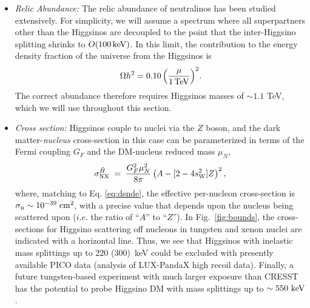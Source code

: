 \documentclass[11pt]{article}
\newcommand{\tev}{{\rm TeV}}
\newcommand{\kev}{{\rm keV}}
\newcommand{\be}{\begin{equation}}
\newcommand{\ee}{\end{equation}}
\begin{document}
\begin{itemize}
\item {\it Relic Abundance: } The relic abundance of neutralinos has been studied extensively. For simplicity, we will assume a spectrum where all superpartners other than the Higgsinos are decoupled to the point that the inter-Higgsino splitting shrinks to $O(100\, \kev)$. In this limit, the contribution to the energy density fraction of the universe from the Higgsinos is~\cite{ArkaniHamed:2006mb}
\be
\Omega h^2 = 0.10\, \Big( \frac{\mu}{1\, \tev} \Big)^2.
\ee
The correct abundance therefore requires Higgsinos masses of $\sim 1.1$ TeV, which we will use throughout this section.

\item {\it Cross section:} Higgsinos couple to nuclei via the $Z$ boson, and the dark matter-\emph{nucleus} cross-section in this case can be parameterized in terms of the Fermi coupling $G_F$ and the DM-nucleus reduced mass $\mu_N$, 
\begin{align}
\sigma_{\rm NX}^{\tilde{H}} \; = \; \frac{G_{F}^2 \mu_N^2}{8 \pi} \left(A-[2-4s^2_{\rm W}]Z \right)^2,
\end{align}
where, matching to Eq. \ref{eq:dsnde}, the effective per-nucleon cross-section is $\sigma_{\rm n} \sim 10^{-39} \; {\rm cm}^2$, with a precise value that depends upon the nucleus being scattered upon ($i.e.$ the ratio of ``$A$'' to ``$Z$''). In Fig.~\ref{fig:bounds}, the cross-sections for Higgsino scattering off nucleons in tungsten and xenon nuclei are indicated with a horizontal line. Thus, we see that Higgsinos with inelastic mass splittings up to $220$ ($300$)~keV could be excluded with presently available PICO data (analysis of LUX-PandaX high recoil data). Finally, a future tungsten-based experiment with much larger exposure than CRESST has the potential to probe Higgsino DM with mass splittings up to $\sim 550 ~{\rm keV}$. 


\end{itemize}
\end{document}
